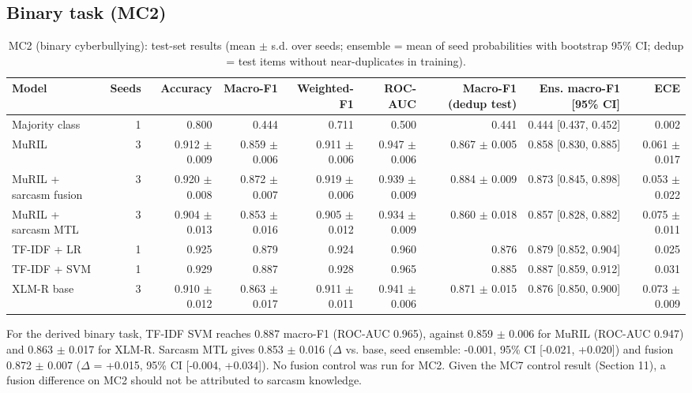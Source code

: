 \documentclass[10pt,twocolumn]{article}
\begin{document}
\subsection{Binary task (MC2)}

\begin{table}[t]
\centering
\small
\caption{MC2 (binary cyberbullying): test-set results (mean $\pm$ s.d. over seeds; ensemble = mean of seed probabilities with bootstrap 95\% CI; dedup = test items without near-duplicates in training).}
\label{tab:mc2}
\begin{adjustbox}{max width=\textwidth}\begin{tabular}{lrrrrrrrr}
\toprule
Model & Seeds & Accuracy & Macro-F1 & Weighted-F1 & ROC-AUC & Macro-F1 (dedup test) & Ens. macro-F1 [95\% CI] & ECE \\
\midrule
Majority class & 1 & 0.800 & 0.444 & 0.711 & 0.500 & 0.441 & 0.444 [0.437, 0.452] & 0.002 \\
MuRIL & 3 & 0.912 $\pm$ 0.009 & 0.859 $\pm$ 0.006 & 0.911 $\pm$ 0.006 & 0.947 $\pm$ 0.006 & 0.867 $\pm$ 0.005 & 0.858 [0.830, 0.885] & 0.061 $\pm$ 0.017 \\
MuRIL + sarcasm fusion & 3 & 0.920 $\pm$ 0.008 & 0.872 $\pm$ 0.007 & 0.919 $\pm$ 0.006 & 0.939 $\pm$ 0.009 & 0.884 $\pm$ 0.009 & 0.873 [0.845, 0.898] & 0.053 $\pm$ 0.022 \\
MuRIL + sarcasm MTL & 3 & 0.904 $\pm$ 0.013 & 0.853 $\pm$ 0.016 & 0.905 $\pm$ 0.012 & 0.934 $\pm$ 0.009 & 0.860 $\pm$ 0.018 & 0.857 [0.828, 0.882] & 0.075 $\pm$ 0.011 \\
TF-IDF + LR & 1 & 0.925 & 0.879 & 0.924 & 0.960 & 0.876 & 0.879 [0.852, 0.904] & 0.025 \\
TF-IDF + SVM & 1 & 0.929 & 0.887 & 0.928 & 0.965 & 0.885 & 0.887 [0.859, 0.912] & 0.031 \\
XLM-R base & 3 & 0.910 $\pm$ 0.012 & 0.863 $\pm$ 0.017 & 0.911 $\pm$ 0.011 & 0.941 $\pm$ 0.006 & 0.871 $\pm$ 0.015 & 0.876 [0.850, 0.900] & 0.073 $\pm$ 0.009 \\
\bottomrule
\end{tabular}\end{adjustbox}
\end{table}


For the derived binary task, TF-IDF SVM reaches 0.887 macro-F1 (ROC-AUC
0.965), against 0.859 $\pm$
0.006 for MuRIL (ROC-AUC 0.947) and
0.863 $\pm$ 0.017 for XLM-R. Sarcasm MTL gives
0.853 $\pm$ 0.016 ($\Delta$ vs. base, seed ensemble:
-0.001, 95\% CI [-0.021,
+0.020]) and fusion 0.872 $\pm$
0.007 ($\Delta$ = +0.015, 95\% CI
[-0.004, +0.034]). No fusion control
was run for MC2. Given the MC7 control result (Section 11), a fusion difference on MC2 should not be attributed to
sarcasm knowledge.
\end{document}
